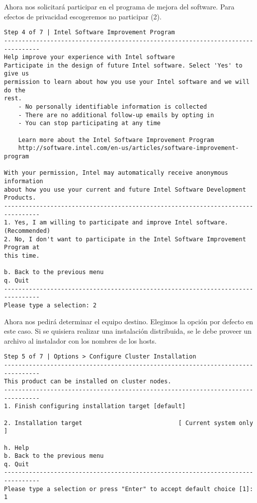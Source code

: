 Ahora nos solicitará participar en el programa de mejora del software. Para efectos de privacidad escogeremos no participar (2).

\begin{lstlisting}
Step 4 of 7 | Intel Software Improvement Program
--------------------------------------------------------------------------------
Help improve your experience with Intel software     
Participate in the design of future Intel software. Select 'Yes' to give us
permission to learn about how you use your Intel software and we will do the
rest.
    - No personally identifiable information is collected
    - There are no additional follow-up emails by opting in
    - You can stop participating at any time
		 
    Learn more about the Intel Software Improvement Program
    http://software.intel.com/en-us/articles/software-improvement-program

With your permission, Intel may automatically receive anonymous information 
about how you use your current and future Intel Software Development Products.
--------------------------------------------------------------------------------
1. Yes, I am willing to participate and improve Intel software. (Recommended)
2. No, I don't want to participate in the Intel Software Improvement Program at
this time.

b. Back to the previous menu
q. Quit
--------------------------------------------------------------------------------
Please type a selection: 2
\end{lstlisting}

Ahora nos pedirá determinar el equipo destino. Elegimos la opción por defecto en este caso. Si se quisiera realizar una instalación distribuida, se le debe proveer un archivo al instalador con los nombres de los hosts.

\begin{lstlisting}
Step 5 of 7 | Options > Configure Cluster Installation
--------------------------------------------------------------------------------
This product can be installed on cluster nodes.
--------------------------------------------------------------------------------
1. Finish configuring installation target [default]

2. Installation target                           [ Current system only ]

h. Help
b. Back to the previous menu
q. Quit
--------------------------------------------------------------------------------
Please type a selection or press "Enter" to accept default choice [1]: 1
\end{lstlisting}

